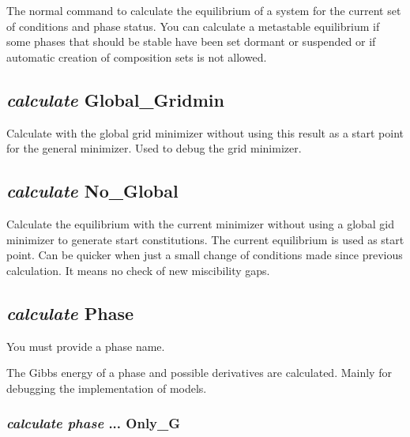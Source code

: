 \documentclass[12pt]{article}
\begin{document}
The normal command to calculate the equilibrium of a system for the
current set of conditions and phase status.  You can calculate a
metastable equilibrium if some phases that should be stable have been
set dormant or suspended or if automatic creation of composition sets
is not allowed.

\subsection{{\em calculate} Global\_Gridmin}

Calculate with the global grid minimizer without using this result as a
start point for the general minimizer.  Used to debug the grid
minimizer.

\subsection{{\em calculate} No\_Global}

Calculate the equilibrium with the current minimizer without using a
global gid minimizer to generate start constitutions.  The current
equilibrium is used as start point.  Can be quicker when just a small
change of conditions made since previous calculation.  It means no
check of new miscibility gaps.

\subsection{{\em calculate} Phase}

You must provide a phase name.

The Gibbs energy of a phase and possible derivatives are calculated.
Mainly for debugging the implementation of models.

\subsubsection{{\em calculate phase} ... Only\_G}
\end{document}
